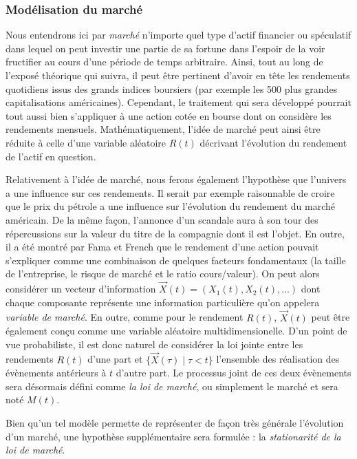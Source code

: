 \subsubsection{Modélisation du marché}

Nous entendrons ici par \textit{marché} n'importe quel type d'actif financier ou
spéculatif dans lequel on peut investir une partie de sa fortune dans l'espoir de la voir
fructifier au cours d'une période de temps arbitraire. Ainsi, tout au long de l'exposé
théorique qui suivra, il peut être pertinent d'avoir en tête les rendements quotidiens
issus des grands indices boursiers (par exemple les 500 plus grandes capitalisations
américaines). Cependant, le traitement qui sera développé pourrait tout aussi bien
s'appliquer à une action cotée en bourse dont on considère les rendements mensuels.
Mathématiquement, l'idée de marché peut ainsi être réduite à celle d'une variable
aléatoire $R(t)$ décrivant l'évolution du rendement de l'actif en question.

Relativement à l'idée de marché, nous ferons également l'hypothèse que l'univers a une
influence sur ces rendements. Il serait par exemple raisonnable de croire que le prix du
pétrole a une influence sur l'évolution du rendement du marché américain. De la même
façon, l'annonce d'un scandale aura à son tour des répercussions sur la valeur du titre de
la compagnie dont il est l'objet. En outre, il a été montré par Fama et French que le
rendement d'une action pouvait s'expliquer comme une combinaison de quelques facteurs
fondamentaux (la taille de l'entreprise, le risque de marché et le ratio cours/valeur). On
peut alors considérer un vecteur d'information $\vec X(t) = (X_1(t), X_2(t), \dots)$ dont
chaque composante représente une information particulière qu'on appelera \textit{variable
  de marché}. En outre, comme pour le rendement $R(t)$, $\vec X(t)$ peut être également
conçu comme une variable aléatoire multidimensionelle. D'un point de vue probabiliste, il
est donc naturel de considérer la loi jointe entre les rendements $R(t)$ d'une part et
$\{\vec X(\tau) \mid \tau < t\}$ l'ensemble des réalisation des évènements antérieurs à
$t$ d'autre part. Le processus joint de ces deux évènements sera désormais défini comme
\textit{la loi de marché}, ou simplement le marché et sera noté $M(t)$.


Bien qu'un tel modèle permette de représenter de façon très générale l'évolution d'un
marché, une hypothèse supplémentaire sera formulée : la \textit{stationarité de la loi de
  marché}.

